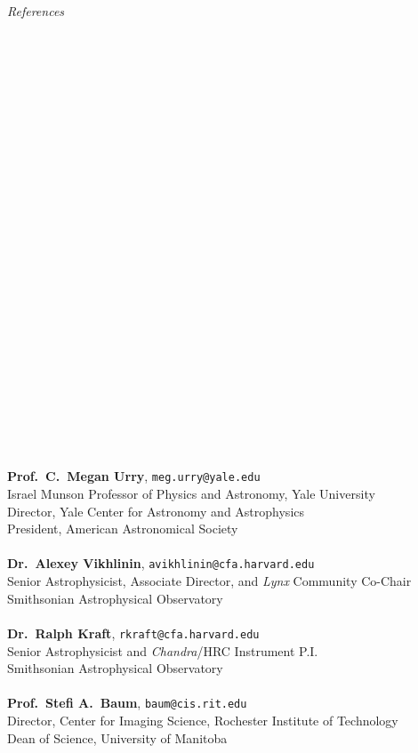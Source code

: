 \documentclass[11pt]{article}
\begin{document}
\hspace{2.5mm} \parbox{1.5in}{\textit{References \\\\\\\\\\\\\\\\\\\\\\\\\\\\\\\\\\\\\\\\\\\\\\\\\\\\}} \parbox{5.15in}{
\textbf{Prof.~C.~Megan Urry}, \texttt{meg.urry@yale.edu}\\
Israel Munson Professor of Physics and Astronomy, Yale University\\
Director, Yale Center for Astronomy and Astrophysics\\
President, American Astronomical Society\\ \\
\textbf{Dr.~Alexey Vikhlinin}, \texttt{avikhlinin@cfa.harvard.edu}\\
Senior Astrophysicist, Associate Director, and \textit{Lynx} Community Co-Chair\\
Smithsonian Astrophysical Observatory\\ \\
\textbf{Dr.~Ralph Kraft}, \texttt{rkraft@cfa.harvard.edu}\\
Senior Astrophysicist and \textit{Chandra}/HRC Instrument P.I.\\
Smithsonian Astrophysical Observatory\\ \\
\textbf{Prof.~Stefi A.~Baum}, \texttt{baum@cis.rit.edu}\\
Director, Center for Imaging Science, Rochester Institute of Technology\\
Dean of Science, University of Manitoba\\ \\
}
\end{document}
